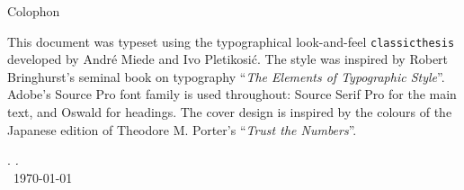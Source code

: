 \thispagestyle{empty}

\hfill

\vfill

\noindent Colophon

\noindent This document was typeset using the typographical look-and-feel \texttt{classicthesis} developed by Andr\'e Miede and Ivo Pletikosić.
The style was inspired by Robert Bringhurst's seminal book on typography ``\emph{The Elements of Typographic Style}''.
Adobe's Source Pro font family is used throughout: Source Serif Pro for the main text, and Oswald for headings.
The cover design is inspired by the colours of the Japanese edition of Theodore M. Porter's ``\emph{Trust the Numbers}''.

\bigskip

\noindent\finalVersionString

\noindent\myName. \textit{\myTitle.}%
\\
\textcopyright\ \today

%
%
%
%
%
